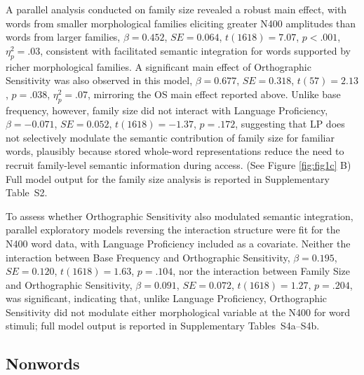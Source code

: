 \documentclass[utf8]{FrontiersinHarvard} %
\begin{document}
	A parallel analysis conducted on family size revealed a robust main effect, with words from smaller morphological families eliciting greater N400 amplitudes than words from larger families, $\beta = 0.452$, $SE = 0.064$, $t(1618) = 7.07$, $p < .001$, $\eta^2_p = .03$, consistent with facilitated semantic integration for words supported by richer morphological families. A significant main effect of Orthographic Sensitivity was also observed in this model, $\beta = 0.677$, $SE = 0.318$, $t(57) = 2.13$, $p = .038$, $\eta^2_p = .07$, mirroring the OS main effect reported above. Unlike base frequency, however, family size did not interact with Language Proficiency, $\beta = -0.071$, $SE = 0.052$, $t(1618) = -1.37$, $p = .172$, suggesting that LP does not selectively modulate the semantic contribution of family size for familiar words, plausibly because stored whole-word representations reduce the need to recruit family-level semantic information during access. (See Figure \ref{fig:fig1c} B) Full model output for the family size analysis is reported in Supplementary Table~S2.

	To assess whether Orthographic Sensitivity also modulated semantic integration, parallel exploratory models reversing the interaction structure were fit for the N400 word data, with Language Proficiency included as a covariate. Neither the interaction between Base Frequency and Orthographic Sensitivity, $\beta = 0.195$, $SE = 0.120$, $t(1618) = 1.63$, $p = .104$, nor the interaction between Family Size and Orthographic Sensitivity, $\beta = 0.091$, $SE = 0.072$, $t(1618) = 1.27$, $p = .204$, was significant, indicating that, unlike Language Proficiency, Orthographic Sensitivity did not modulate either morphological variable at the N400 for word stimuli; full model output is reported in Supplementary Tables~S4a--S4b.

	\subsection{Nonwords}
	
\end{document}
